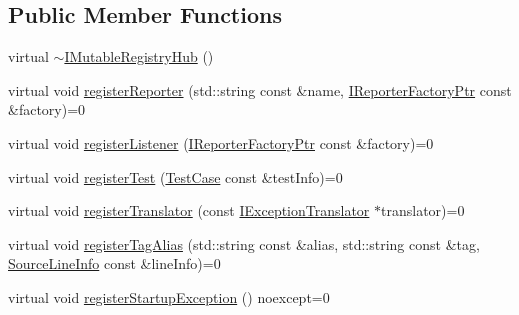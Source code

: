 \subsection*{Public Member Functions}
\begin{DoxyCompactItemize}
\item 
virtual \hyperlink{struct_catch_1_1_i_mutable_registry_hub_a759ca1e044e19f905fb4d306f1367193}{$\sim$\-I\-Mutable\-Registry\-Hub} ()
\item 
virtual void \hyperlink{struct_catch_1_1_i_mutable_registry_hub_a1c0ac202ac31ee9f88e8ff5cbac4b243}{register\-Reporter} (std\-::string const \&name, \hyperlink{namespace_catch_ad1b36ac40c2739e52fd453dcdddf0d09}{I\-Reporter\-Factory\-Ptr} const \&factory)=0
\item 
virtual void \hyperlink{struct_catch_1_1_i_mutable_registry_hub_abd892a133f85581fd00ee75bb379ca56}{register\-Listener} (\hyperlink{namespace_catch_ad1b36ac40c2739e52fd453dcdddf0d09}{I\-Reporter\-Factory\-Ptr} const \&factory)=0
\item 
virtual void \hyperlink{struct_catch_1_1_i_mutable_registry_hub_a11b85c6744d88c9f83fe16ad4a8dd451}{register\-Test} (\hyperlink{class_catch_1_1_test_case}{Test\-Case} const \&test\-Info)=0
\item 
virtual void \hyperlink{struct_catch_1_1_i_mutable_registry_hub_ae6825365102693cf7707db022a2c2b49}{register\-Translator} (const \hyperlink{struct_catch_1_1_i_exception_translator}{I\-Exception\-Translator} $\ast$translator)=0
\item 
virtual void \hyperlink{struct_catch_1_1_i_mutable_registry_hub_abf2e386b6f94f615719ada711adbf822}{register\-Tag\-Alias} (std\-::string const \&alias, std\-::string const \&tag, \hyperlink{struct_catch_1_1_source_line_info}{Source\-Line\-Info} const \&line\-Info)=0
\item 
virtual void \hyperlink{struct_catch_1_1_i_mutable_registry_hub_a72a7d5386851ac3200f8da794a009c86}{register\-Startup\-Exception} () noexcept=0
\end{DoxyCompactItemize}


